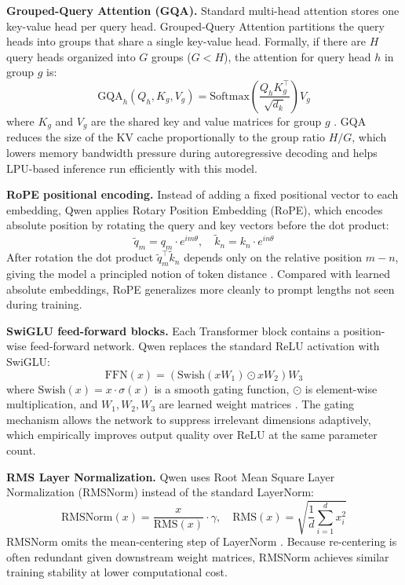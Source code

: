 \documentclass[12pt,a4paper,openany]{report}
\begin{document}
\textbf{Grouped-Query Attention (GQA).} Standard multi-head attention stores one key-value head per query head. Grouped-Query Attention partitions the query heads into groups that share a single key-value head. Formally, if there are $H$ query heads organized into $G$ groups ($G < H$), the attention for query head $h$ in group $g$ is:
\begin{equation}
\text{GQA}_h(Q_h, K_g, V_g) = \text{Softmax}\!\left(\frac{Q_h K_g^{\top}}{\sqrt{d_k}}\right) V_g
\label{eq:gqa}
\end{equation}
where $K_g$ and $V_g$ are the shared key and value matrices for group $g$ \cite{ainslie2023gqa}. GQA reduces the size of the KV cache proportionally to the group ratio $H/G$, which lowers memory bandwidth pressure during autoregressive decoding and helps LPU-based inference run efficiently with this model.

\textbf{RoPE positional encoding.} Instead of adding a fixed positional vector to each embedding, Qwen applies Rotary Position Embedding (RoPE), which encodes absolute position by rotating the query and key vectors before the dot product:
\begin{equation}
\tilde{q}_m = q_m \cdot e^{i m \theta}, \quad \tilde{k}_n = k_n \cdot e^{i n \theta}
\label{eq:rope}
\end{equation}
After rotation the dot product $\tilde{q}_m^{\top}\tilde{k}_n$ depends only on the relative position $m-n$, giving the model a principled notion of token distance \cite{su2021rope}. Compared with learned absolute embeddings, RoPE generalizes more cleanly to prompt lengths not seen during training.

\textbf{SwiGLU feed-forward blocks.} Each Transformer block contains a position-wise feed-forward network. Qwen replaces the standard ReLU activation with SwiGLU:
\begin{equation}
\text{FFN}(x) = \left(\text{Swish}(xW_1) \odot xW_2\right) W_3
\label{eq:swiglu}
\end{equation}
where $\text{Swish}(x) = x \cdot \sigma(x)$ is a smooth gating function, $\odot$ is element-wise multiplication, and $W_1, W_2, W_3$ are learned weight matrices \cite{shazeer2020swiglu}. The gating mechanism allows the network to suppress irrelevant dimensions adaptively, which empirically improves output quality over ReLU at the same parameter count.

\textbf{RMS Layer Normalization.} Qwen uses Root Mean Square Layer Normalization (RMSNorm) instead of the standard LayerNorm:
\begin{equation}
\text{RMSNorm}(x) = \frac{x}{\text{RMS}(x)} \cdot \gamma, \quad \text{RMS}(x) = \sqrt{\frac{1}{d}\sum_{i=1}^{d} x_i^2}
\label{eq:rmsnorm}
\end{equation}
RMSNorm omits the mean-centering step of LayerNorm \cite{zhang2019rmsnorm}. Because re-centering is often redundant given downstream weight matrices, RMSNorm achieves similar training stability at lower computational cost.
\end{document}
